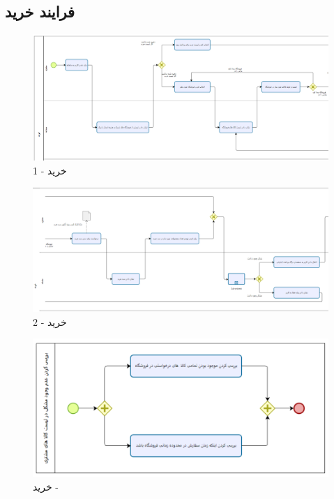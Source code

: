 \documentclass[12pt,a4paper]{article}
\begin{document}
\subsection{فرایند خرید} \label{section.function.buy}
	\begin{figure}[h!]
		\begin{center}
			\includegraphics[width=14cm]{images/Bizagi Buy 1.png}	
		\end{center}
		\caption{خرید - 1}
	\end{figure}
	\begin{figure}[h!]
		\begin{center}
			\includegraphics[width=14cm]{images/Bizagi Buy 2.png}	
		\end{center}
		\caption{خرید - 2}
	\end{figure}
	\pagebreak
	\begin{figure}[h!]
		\begin{center}
			\includegraphics[width=14cm]{images/Bizagi Buy Sub-Process.png}	
		\end{center}
		\caption{خرید - }
	\end{figure}
\end{document}
